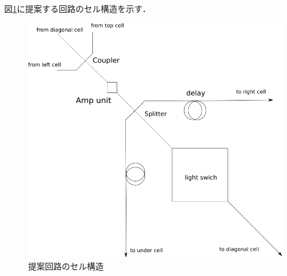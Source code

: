 図\ref{fig:proposalcell}に提案する回路のセル構造を示す．
\begin{figure}[t!]
\begin{center}
\includegraphics[keepaspectratio,scale=0.5]{fig/3/lightracelogic_cell_6.png}
\caption{提案回路のセル構造}
\label{fig:proposalcell}
\end{center}
\end{figure}


